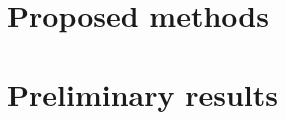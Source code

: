 \documentclass[titlepage]{article}
\begin{document}


\section{Proposed methods}


\section{Preliminary results}
\end{document}
